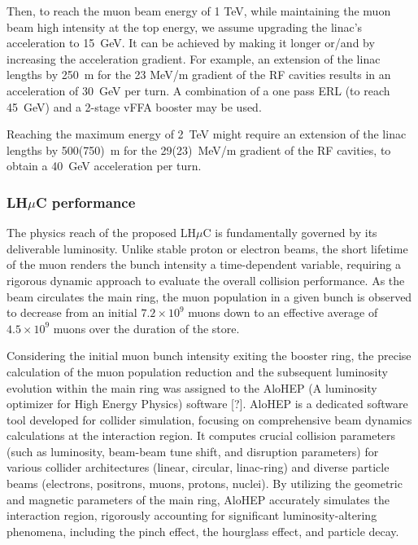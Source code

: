 \documentclass[a4paper,11pt]{article}
\begin{document}
Then, to reach the muon beam energy of 1 TeV, while maintaining the muon beam high intensity at the top energy, we assume upgrading the linac's acceleration to 15~GeV. It can be achieved by making it longer or/and by increasing the acceleration gradient. For example, an extension of the linac lengths by 250~m for the 23 MeV/m gradient of the RF cavities results in an acceleration of 30~GeV per turn. A combination of a one pass ERL (to reach 45~GeV) and a 2-stage vFFA booster may be used.

Reaching the maximum energy of 2~TeV might require an extension of the linac lengths by 500(750)~m for the 29(23)~MeV/m gradient of the RF cavities, to obtain a 40~GeV acceleration per turn. 

\subsubsection{\texorpdfstring{LH$\mu$C}{LHuC} performance}

The physics reach of the proposed LH$\mu$C is fundamentally governed by its deliverable luminosity. Unlike stable proton or electron beams, the short lifetime of the muon renders the bunch intensity a time-dependent variable, requiring a rigorous dynamic approach to evaluate the overall collision performance. As the beam circulates the main ring, the muon population in a given bunch is observed to decrease from an initial $7.2 \times 10^9$ muons down to an effective average of $4.5 \times 10^9$ muons over the duration of the store.

Considering the initial muon bunch intensity exiting the booster ring, the precise calculation of the muon population reduction and the subsequent luminosity evolution within the main ring was assigned to the AloHEP (A luminosity optimizer for High Energy Physics) software [?]. AloHEP is a dedicated software tool developed for collider simulation, focusing on comprehensive beam dynamics calculations at the interaction region. It computes crucial collision parameters (such as luminosity, beam-beam tune shift, and disruption parameters) for various collider architectures (linear, circular, linac-ring) and diverse particle beams (electrons, positrons, muons, protons, nuclei). By utilizing the geometric and magnetic parameters of the main ring, AloHEP accurately simulates the interaction region, rigorously accounting for significant luminosity-altering phenomena, including the pinch effect, the hourglass effect, and particle decay.
\end{document}
